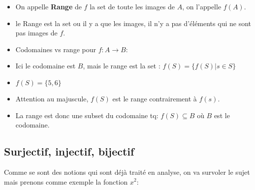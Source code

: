 \begin{itemize}
    \item On appelle \textbf{Range} de $f$ la set de toute les images de $A$, on l'appelle $f(A)$.
    \item le Range est la set ou il y a que les images, il n'y a pas d'éléments qui ne sont pas images de $f$.
    \item Codomaines vs range pour $f: A \to B$: 
\end{itemize}

\begin{center}
    
\end{center}
\begin{itemize}
    \item Ici le codomaine est $B$, mais le range est la set : $f(S) = \{ f(S) | s \in S\}$
    \item $f(S) = \{ 5, 6\}$
    \item Attention au majuscule, $f(S)$ est le range contrairement à $f(s)$.
    \item La range est donc une subset du codomaine tq: $f(S) \subseteq B$ où $B$ est le codomaine.
\end{itemize}
\subsection{Surjectif, injectif, bijectif}
Comme se sont des notions qui sont déjà traité en analyse, on va survoler le sujet mais prenons comme exemple la fonction $x^2$: 
\\

\hspace{0.7cm}
\begin{center}
\end{center}

